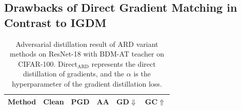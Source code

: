 \documentclass{article} %
\begin{document}
\subsection{Drawbacks of Direct Gradient Matching in Contrast to IGDM}
\label{sec:direct_matching}
\begin{table}[h]
 \centering
 \caption{Adversarial distillation result of ARD variant methods on ResNet-18 with BDM-AT teacher on CIFAR-100. Direct$_{\text{ARD}}$ represents the direct distillation of gradients, and the $\alpha$ is the hyperparameter of the gradient distillation loss.}
 \setlength{\tabcolsep}{14pt}
 \begin{tabular}{lccccc}
 \toprule
 \multicolumn{1}{c}{Method}  & Clean & PGD & AA & GD$\Downarrow$ & GC$\Uparrow$ \\
\midrule


\end{tabular}
\end{table}
\end{document}

